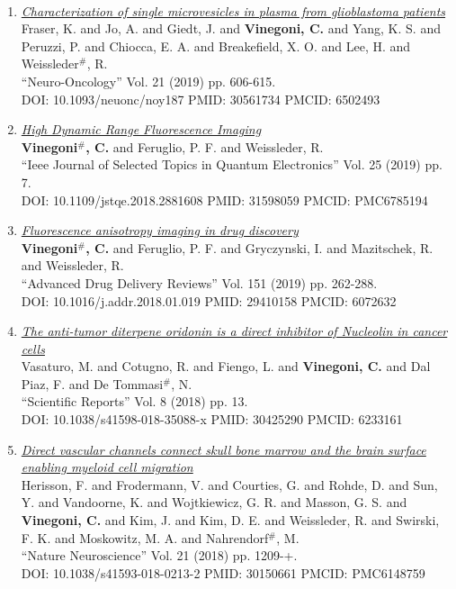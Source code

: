 \documentclass{resume}
\begin{document}
\begin{category}{~~}
\begin{enumerate}
\item \href{https://cvinegoni.github.io/assets/pdf/papers/2019-NO.pdf}{\it  Characterization of single microvesicles in plasma from glioblastoma patients} \\ Fraser, K. and Jo, A. and Giedt, J. and {\bf Vinegoni, C.} and Yang, K. S. and Peruzzi, P. and Chiocca, E. A. and Breakefield, X. O. and Lee, H. and Weissleder$^\#$, R. \\ ``Neuro-Oncology'' Vol. 21 (2019) pp. 606-615. \\ DOI: 10.1093/neuonc/noy187 PMID: 30561734 PMCID: 6502493

\item \href{https://cvinegoni.github.io/assets/pdf/papers/2019-JSTQE.pdf}{\it  High Dynamic Range Fluorescence Imaging} \\ {\bf Vinegoni$^\#$, C.} and Feruglio, P. F. and Weissleder, R. \\ ``Ieee Journal of Selected Topics in Quantum Electronics'' Vol. 25 (2019) pp. 7. \\ DOI: 10.1109/jstqe.2018.2881608 PMID: 31598059 PMCID: PMC6785194

\item \href{https://cvinegoni.github.io/assets/pdf/papers/2019-ADDR.pdf}{\it  Fluorescence anisotropy imaging in drug discovery} \\ {\bf Vinegoni$^\#$, C.} and Feruglio, P. F. and Gryczynski, I. and Mazitschek, R. and Weissleder, R. \\ ``Advanced Drug Delivery Reviews'' Vol. 151 (2019) pp. 262-288. \\ DOI: 10.1016/j.addr.2018.01.019 PMID: 29410158 PMCID: 6072632

\item \href{https://cvinegoni.github.io/assets/pdf/papers/2018-SCIREP.pdf}{\it  The anti-tumor diterpene oridonin is a direct inhibitor of Nucleolin in cancer cells} \\ Vasaturo, M. and Cotugno, R. and Fiengo, L. and {\bf Vinegoni, C.} and Dal Piaz, F. and De Tommasi$^\#$, N. \\ ``Scientific Reports'' Vol. 8 (2018) pp. 13. \\ DOI: 10.1038/s41598-018-35088-x PMID: 30425290 PMCID: 6233161

\item \href{https://cvinegoni.github.io/assets/pdf/papers/2018-NATNEURO.pdf}{\it  Direct vascular channels connect skull bone marrow and the brain surface enabling myeloid cell migration} \\ Herisson, F. and Frodermann, V. and Courties, G. and Rohde, D. and Sun, Y. and Vandoorne, K. and Wojtkiewicz, G. R. and Masson, G. S. and {\bf Vinegoni, C.} and Kim, J. and Kim, D. E. and Weissleder, R. and Swirski, F. K. and Moskowitz, M. A. and Nahrendorf$^\#$, M. \\ ``Nature Neuroscience'' Vol. 21 (2018) pp. 1209-+. \\ DOI: 10.1038/s41593-018-0213-2 PMID: 30150661 PMCID: PMC6148759 


\end{enumerate}
\end{category}
\end{document}
